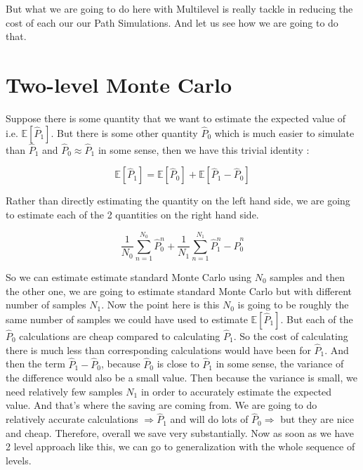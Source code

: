 \documentclass[12pt]{article}
\newcommand{\E}{\mathbb{E}}
\begin{document}
But what we are going to do here with Multilevel is really tackle in reducing the cost of each our our Path Simulations. And let us see how we are going to do that.

\section{Two-level Monte Carlo}
Suppose there is some quantity that we want to estimate the expected value of i.e. 
$\E[\hat{P}_1]$. But there is some other quantity $\hat{P}_0$ which is much easier to simulate than $\hat{P}_1$ and $\hat{P}_0 \approx \hat{P}_1$ in some sense, then we have this trivial identity : 

\begin{equation} \E[\hat{P}_1] = \E[\hat{P}_0] + \E[\hat{P}_1 - \hat{P}_0]\end{equation} 

Rather than directly estimating the quantity on the left hand side, we are going to estimate each of the 2 quantities on the right hand side. 

\begin{equation} \frac{1}{N_0}\sum_{n=1}^{N_0} \hat{P}^n_0 + \frac{1}{N_1}\sum_{n=1}^{N_1} \hat{P}^n_1 - \hat{P}^n_0\end{equation} 

So we can estimate estimate standard Monte Carlo using $N_0$ samples and then the other one, we are going to estimate standard Monte Carlo but with different number of samples $N_1$. Now the point here is this $N_0$ is going to be roughly the same number of samples we could have used to estimate $\E[\hat{P}_1]$. But each of the $\hat{P}_0$ calculations are cheap compared to calculating $\hat{P}_1$. So the cost of calculating there is much less than corresponding calculations would have been for $\hat{P}_1$. And then the term $\hat{P}_1 - \hat{P}_0$, because $\hat{P}_0$ is close to $\hat{P}_1$ in some sense, the variance of the difference would also be a small value. Then because the variance is small, we need relatively few samples $N_1$ in order to accurately estimate the expected value. And that's where the saving are coming from. We are going to do relatively accurate calculations $\Rightarrow \hat{P}_1$ and will do lots of $\hat{P}_0 \Rightarrow$ but they are nice and cheap. Therefore, overall we save very substantially. Now as soon as we have 2 level approach like this, we can go to generalization with the whole sequence of levels.  

\clearpage
\end{document}
